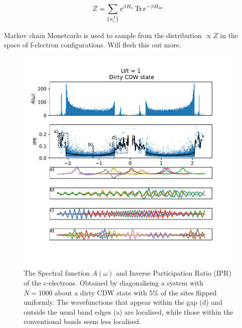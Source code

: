 \documentclass[a4paper, 11pt, onecolumn]{article}
\begin{document}
$$ Z = \sum_{\{ n^f_i \}} e^ {\beta H_{\text{c}}} \Tr e^{-\beta H_{\text{nc}}} $$

Markov chain Monetcarlo is used to sample from the distribution $\propto Z$ in the space of f-electron configurations. Will flesh this out more.


\begin{figure}
  \centering
    \includegraphics[width=\textwidth]{States}
  \caption{The Spectral function $A(\omega)$ and Inverse Participation Ratio (IPR) of the c-electrons. Obtained by diagonalising a system with $N = 1000$ about a dirty CDW state with 5\% of the sites flipped uniformly. The wavefunctions that appear within the gap (d) and outside the usual band edges (a) are localised, while those within the conventional bands seem less localised. }
  \label{fig:states}
\end{figure}
\end{document}
